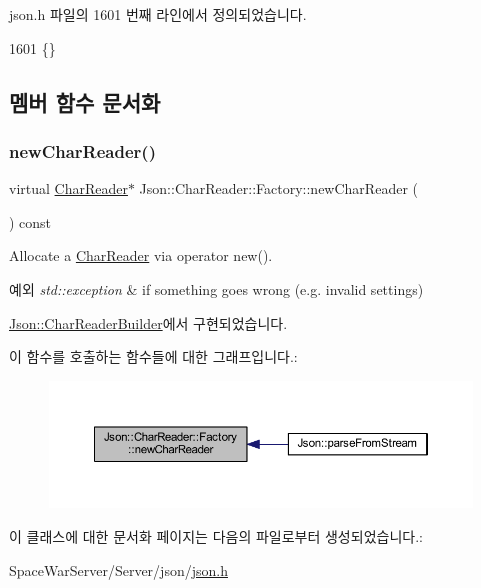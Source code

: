 json.\+h 파일의 1601 번째 라인에서 정의되었습니다.


\begin{DoxyCode}
1601 \{\}
\end{DoxyCode}


\subsection{멤버 함수 문서화}
\mbox{\label{class_json_1_1_char_reader_1_1_factory_a4c5862a1ffd432372dbe65cf59de98c4}} 
\subsubsection{\texorpdfstring{new\+Char\+Reader()}{newCharReader()}}
{\footnotesize\ttfamily virtual \hyperlink{class_json_1_1_char_reader}{Char\+Reader}$\ast$ Json\+::\+Char\+Reader\+::\+Factory\+::new\+Char\+Reader (\begin{DoxyParamCaption}{ }\end{DoxyParamCaption}) const\hspace{0.3cm}{\ttfamily [pure virtual]}}



Allocate a \hyperlink{class_json_1_1_char_reader}{Char\+Reader} via operator new(). 


\begin{DoxyExceptions}{예외}
{\em std\+::exception} & if something goes wrong (e.\+g. invalid settings) \\
\hline
\end{DoxyExceptions}


\hyperlink{class_json_1_1_char_reader_builder_a3a262fcc76c1eb8eebfd4718fb4e9722}{Json\+::\+Char\+Reader\+Builder}에서 구현되었습니다.

이 함수를 호출하는 함수들에 대한 그래프입니다.\+:\nopagebreak
\begin{figure}[H]
\begin{center}
\leavevmode
\includegraphics[width=350pt]{class_json_1_1_char_reader_1_1_factory_a4c5862a1ffd432372dbe65cf59de98c4_icgraph}
\end{center}
\end{figure}


이 클래스에 대한 문서화 페이지는 다음의 파일로부터 생성되었습니다.\+:\begin{DoxyCompactItemize}
\item 
Space\+War\+Server/\+Server/json/\hyperlink{json_8h}{json.\+h}\end{DoxyCompactItemize}

